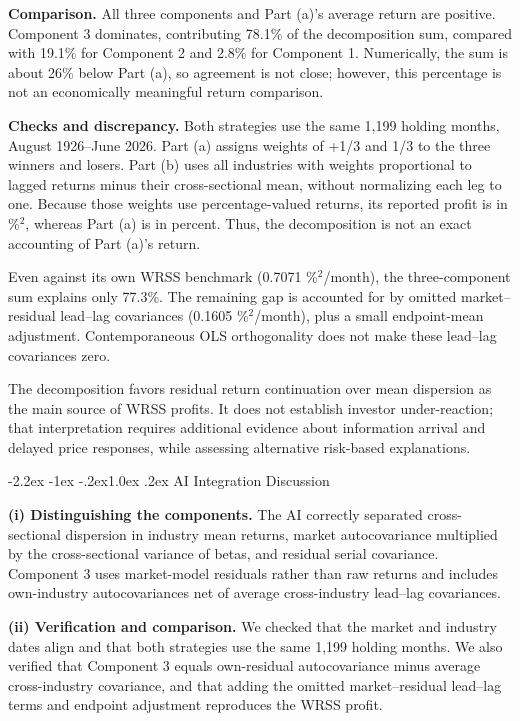 \documentclass[11pt]{article}
\makeatletter
\renewcommand\subsection{\@startsection{subsection}{2}{0pt}%
  {-2.2ex \@plus -1ex \@minus -.2ex}{1.0ex \@plus .2ex}%
  {\normalfont\bfseries\normalsize\color{psink}}}
\makeatother
\begin{document}
\textbf{Comparison.} All three components and Part (a)'s average return are positive. Component 3 dominates, contributing 78.1\% of the decomposition sum, compared with 19.1\% for Component 2 and 2.8\% for Component 1. Numerically, the sum is about 26\% below Part (a), so agreement is not close; however, this percentage is not an economically meaningful return comparison.
 
\textbf{Checks and discrepancy.} Both strategies use the same 1,199 holding months, August 1926--June 2026. Part (a) assigns weights of +1/3 and \textminus{}1/3 to the three winners and losers. Part (b) uses all industries with weights proportional to lagged returns minus their cross-sectional mean, without normalizing each leg to one. Because those weights use percentage-valued returns, its reported profit is in \%$^2$, whereas Part (a) is in percent. Thus, the decomposition is not an exact accounting of Part (a)'s return.
 
Even against its own WRSS benchmark (0.7071 \%$^2$/month), the three-component sum explains only 77.3\%. The remaining gap is accounted for by omitted market--residual lead--lag covariances (0.1605 \%$^2$/month), plus a small endpoint-mean adjustment. Contemporaneous OLS orthogonality does not make these lead--lag covariances zero.
 
The decomposition favors residual return continuation over mean dispersion as the main source of WRSS profits. It does not establish investor under-reaction; that interpretation requires additional evidence about information arrival and delayed price responses, while assessing alternative risk-based explanations.
 
\subsection{AI Integration Discussion}
 
\textbf{(i) Distinguishing the components.} The AI correctly separated cross-sectional dispersion in industry mean returns, market autocovariance multiplied by the cross-sectional variance of betas, and residual serial covariance. Component 3 uses market-model residuals rather than raw returns and includes own-industry autocovariances net of average cross-industry lead--lag covariances.
 
\textbf{(ii) Verification and comparison.} We checked that the market and industry dates align and that both strategies use the same 1,199 holding months. We also verified that Component 3 equals own-residual autocovariance minus average cross-industry covariance, and that adding the omitted market--residual lead--lag terms and endpoint adjustment reproduces the WRSS profit.
 
\end{document}
